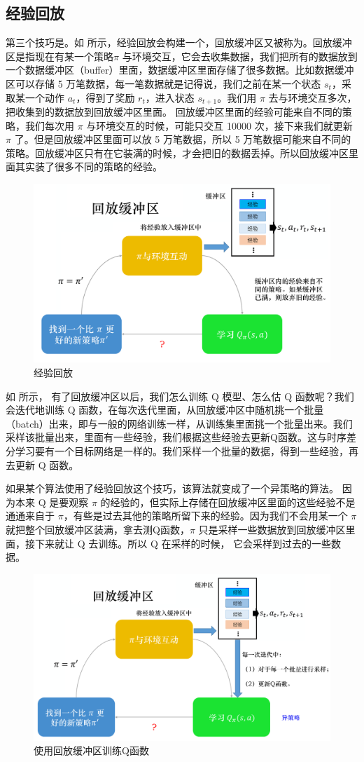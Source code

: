 \subsection{经验回放} 
第三个技巧是。如 所示，经验回放会构建一个，回放缓冲区又被称为。回放缓冲区是指现在有某一个策略$\pi$ 与环境交互，它会去收集数据，我们把所有的数据放到一个数据缓冲区（buffer）里面，数据缓冲区里面存储了很多数据。比如数据缓冲区可以存储 5 万笔数据，每一笔数据就是记得说，我们之前在某一个状态 $s_t$，采取某一个动作 $a_t$，得到了奖励 $r_t$，进入状态 $s_{t+1}$。我们用 $\pi$ 去与环境交互多次，把收集到的数据放到回放缓冲区里面。
回放缓冲区里面的经验可能来自不同的策略，我们每次用 $\pi$ 与环境交互的时候，可能只交互 10000 次，接下来我们就更新 $\pi$ 了。但是回放缓冲区里面可以放 5 万笔数据，所以 5 万笔数据可能来自不同的策略。回放缓冲区只有在它装满的时候，才会把旧的数据丢掉。所以回放缓冲区里面其实装了很多不同的策略的经验。

\begin{figure}[hbt]
    \centering
    \includegraphics[width=0.5\linewidth]{res/ch6/6.17}
    \caption{经验回放}
    \label{fig:fig6.17}
\end{figure}

如 所示，
有了回放缓冲区以后，我们怎么训练 Q 模型、怎么估 Q 函数呢？我们会迭代地训练 Q 函数，在每次迭代里面，从回放缓冲区中随机挑一个批量（batch）出来，即与一般的网络训练一样，从训练集里面挑一个批量出来。我们采样该批量出来，里面有一些经验，我们根据这些经验去更新Q函数。这与时序差分学习要有一个目标网络是一样的。我们采样一个批量的数据，得到一些经验，再去更新 Q 函数。

如果某个算法使用了经验回放这个技巧，该算法就变成了一个异策略的算法。
因为本来 Q 是要观察 $\pi$ 的经验的，但实际上存储在回放缓冲区里面的这些经验不是通通来自于 $\pi$，有些是过去其他的策略所留下来的经验。因为我们不会用某一个 $\pi$ 就把整个回放缓冲区装满，拿去测Q函数，$\pi$ 只是采样一些数据放到回放缓冲区里面，接下来就让 Q 去训练。所以 Q 在采样的时候， 它会采样到过去的一些数据。

\begin{figure}[hbt]
    \centering
    \includegraphics[width=0.5\linewidth]{res/ch6/6.18}
    \caption{使用回放缓冲区训练Q函数}
    \label{fig:fig6.18}
\end{figure}

